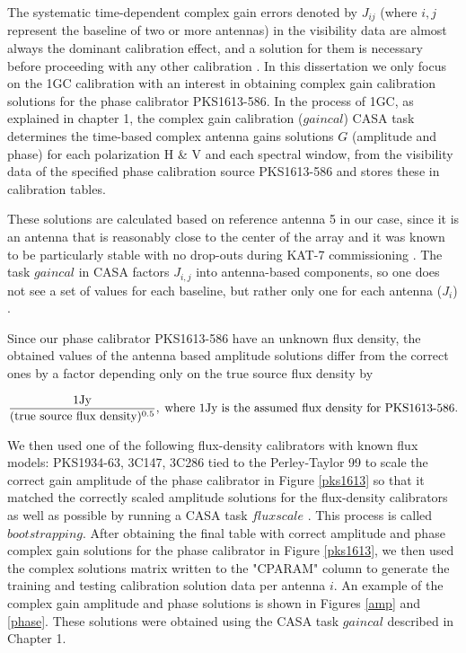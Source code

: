 The systematic time-dependent complex gain errors denoted by $J_{ij}$ (where $i,j$ represent the baseline of two or more antennas) in the visibility data are almost always the dominant calibration effect, and a solution for them is necessary before proceeding with any other calibration \citep{ott2013casa}. In this dissertation we only focus on the 1GC calibration with an interest in obtaining complex gain calibration solutions for the phase calibrator PKS1613-586. In the process of 1GC, as explained in chapter 1, the complex gain calibration ($\textit{gaincal}$)  CASA task determines the time-based complex antenna gains solutions $G$ (amplitude and phase) for each polarization H \& V and each spectral window, from the visibility data of the specified phase calibration source PKS1613-586 and stores these in calibration tables.
 
These solutions are calculated based on reference antenna 5 in our case, since it is an antenna that is reasonably close to the center of the array and it was known to be particularly stable with no drop-outs during KAT-7 commissioning \citep{ott2013casa}. The task $\textit{gaincal}$ in CASA factors $J_{i,j}$ into antenna-based components, so one does not see a set of values for each baseline, but rather only one for each antenna ($J_i$) \citep{CosmoAIMS}. 

Since our phase calibrator PKS1613-586 have an unknown flux density, the obtained values of the antenna based amplitude solutions differ from the correct ones by a factor depending only on the true source flux density by 

\begin{equation}
\frac{1 \mathrm{Jy}}{(\text{true source flux density})^{0.5}},\;  \text{where 1Jy is the assumed flux density for \text{PKS1613-586}}.
\end{equation} 

We then used one of the following flux-density calibrators with known flux models: PKS1934-63, 3C147, 3C286 tied to the Perley-Taylor 99 to scale the correct gain amplitude of the phase calibrator in Figure \ref{pks1613} so that it matched the correctly scaled amplitude solutions for the flux-density calibrators as well as possible by running a CASA task $\textit{fluxscale}$ \citep{CosmoAIMS}. This process is called $\textit{bootstrapping}$. After obtaining the final table with correct amplitude and phase complex gain solutions for the phase calibrator in Figure \ref{pks1613}, we then used the complex solutions matrix written to the "CPARAM" column to generate the training and testing calibration solution data per antenna $i$. An example of the complex gain amplitude and phase solutions is shown in Figures \ref{amp} and \ref{phase}. These solutions were obtained using the CASA task $gaincal$ described in Chapter 1. 

